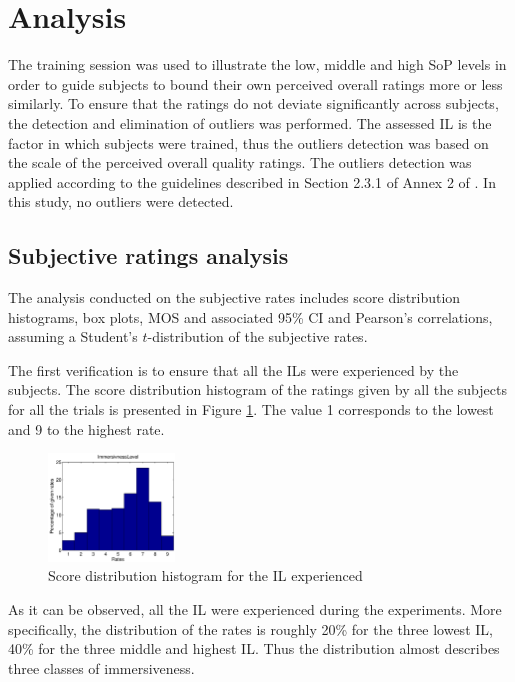 \section{Analysis}
The training session was used to illustrate the low, middle and high \ac{SoP} levels in order to guide subjects to bound their own perceived overall ratings more or less similarly.
To ensure that the ratings do not deviate significantly across subjects, the detection and elimination of outliers was performed.
The assessed \ac{IL} is the factor in which subjects were trained, thus the outliers detection was based on the scale of the perceived overall quality ratings. The outliers detection was applied according to the guidelines described in Section 2.3.1 of Annex 2 of \cite{Outliers}. In this study, no outliers were detected.

\subsection{Subjective ratings analysis}

The analysis conducted on the subjective rates includes score distribution histograms, box plots, \acf{MOS} and associated 95\% \acf{CI} and Pearson's correlations, assuming a Student's $t$-distribution of the subjective rates. 

The first verification is to ensure that all the \acfp{IL} were experienced by the subjects. The score distribution histogram of the ratings given by all the subjects for all the trials is presented in Figure \ref{Hist}. The value 1 corresponds to the lowest and 9 to the highest rate.

\begin{figure}[!ht]
    \center
    \includegraphics[width=0.3\textwidth]{./images/Hist9ImmersivnessLevel.png}
    \caption{Score distribution histogram for the \ac{IL} experienced }
    \label{Hist}
\end{figure}

As it can be observed, all the \ac{IL} were experienced during the experiments. More specifically, the distribution of the rates is roughly 20\% for the three lowest \ac{IL}, 40\% for the three middle and highest \ac{IL}. Thus the distribution almost describes three classes of immersiveness.  

